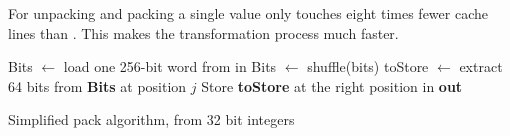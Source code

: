 For \bs{} unpacking and packing a single value only touches eight times fewer
cache lines than \bwv{}. This makes the transformation process much faster.

\begin{algorithm}[h]
\begin{algorithmic}[1]
    \State Bits $\gets$ load one 256-bit word from in
    \State Bits $\gets$ shuffle(bits)
      \State toStore $\gets$ extract 64 bits from \textbf{Bits} at position $j$
      \State Store \textbf{toStore} at the right position in \textbf{out}
    \EndFor
  \EndFor
  \EndProcedure
\end{algorithmic}
\caption{Simplified \bs{} pack algorithm, from 32 bit integers}
\label{algo:packbs}
\end{algorithm}
